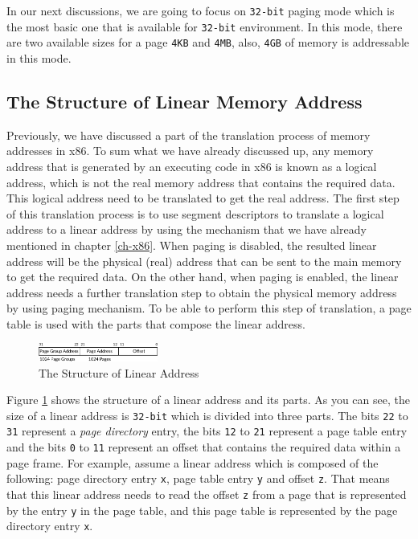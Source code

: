 In our next discussions, we are going to focus on \lstinline!32-bit!
paging mode which is the most basic one that is available for
\lstinline!32-bit! environment. In this mode, there are two available
sizes for a page \lstinline!4KB! and \lstinline!4MB!, also,
\lstinline!4GB! of memory is addressable in this mode.

\subsection{The Structure of Linear Memory
Address}\label{the-structure-of-linear-memory-address}

Previously, we have discussed a part of the translation process of
memory addresses in x86. To sum what we have already discussed up, any
memory address that is generated by an executing code in x86 is known as
a logical address, which is not the real memory address that contains
the required data. This logical address need to be translated to get the
real address. The first step of this translation process is to use
segment descriptors to translate a logical address to a linear address
by using the mechanism that we have already mentioned in chapter
\ref{ch-x86}. When paging is disabled, the resulted linear address will
be the physical (real) address that can be sent to the main memory to
get the required data. On the other hand, when paging is enabled, the
linear address needs a further translation step to obtain the physical
memory address by using paging mechanism. To be able to perform this
step of translation, a page table is used with the parts that compose
the linear address.

\begin{figure}
\centering
\includegraphics[width=0.35000\textwidth]{Figures/memory-ch/Fig091021_0.png}
\caption{The Structure of Linear Address}\label{fig:10062021_3}
\end{figure}

Figure \ref{fig:10062021_3} shows the structure of a linear address and
its parts. As you can see, the size of a linear address is
\lstinline!32-bit! which is divided into three parts. The bits
\lstinline!22! to \lstinline!31! represent a \emph{page directory}
entry, the bits \lstinline!12! to \lstinline!21! represent a page table
entry and the bits \lstinline!0! to \lstinline!11! represent an offset
that contains the required data within a page frame. For example, assume
a linear address which is composed of the following: page directory
entry \lstinline!x!, page table entry \lstinline!y! and offset
\lstinline!z!. That means that this linear address needs to read the
offset \lstinline!z! from a page that is represented by the entry
\lstinline!y! in the page table, and this page table is represented by
the page directory entry \lstinline!x!.

